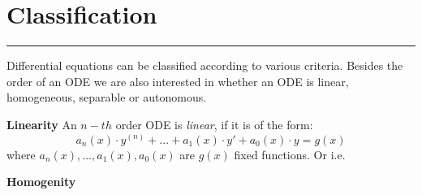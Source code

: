 \section{Classification}
\noindent\rule[\linienAbstand]{\linewidth}{\linienDickeDick}

Differential equations can be classified according to various criteria. Besides the order of an ODE we are also interested in whether an ODE is linear, homogeneous, separable or autonomous.

\textbf{Linearity}
An $n-th$ order ODE is \emph{linear}, if it is of the form:
\begin{equation*}
  a_n(x) \cdot y^{(n)} + ... + a_1(x) \cdot y' + a_0(x) \cdot y = g(x)
\end{equation*}
where $a_n(x), ..., a_1(x), a_0(x)$ are $g(x)$ fixed functions. Or i.e.

\textbf{Homogenity}
